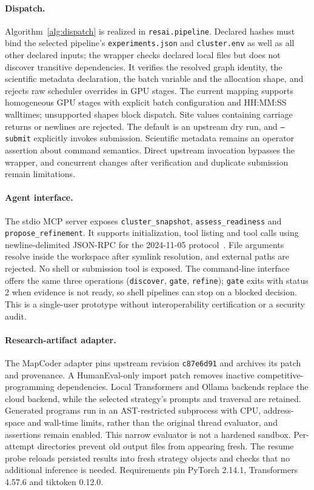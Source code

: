 \documentclass[pdflatex,sn-mathphys-num]{sn-jnl}
\theoremstyle{thmstylethree}
\newcommand{\code}[1]{\texttt{#1}}
\begin{document}
\paragraph{Dispatch.} Algorithm~\ref{alg:dispatch} is realized in \code{resai.pipeline}. Declared hashes must bind the selected pipeline's \code{experiments.json} and \code{cluster.env} as well as all other declared inputs; the wrapper checks declared local files but does not discover transitive dependencies. It verifies the resolved graph identity, the scientific metadata declaration, the batch variable and the allocation shape, and rejects raw scheduler overrides in GPU stages. The current mapping supports homogeneous GPU stages with explicit batch configuration and HH:MM:SS walltimes; unsupported shapes block dispatch. Site values containing carriage returns or newlines are rejected. The default is an upstream dry run, and \code{--submit} explicitly invokes submission. Scientific metadata remains an operator assertion about command semantics. Direct upstream invocation bypasses the wrapper, and concurrent changes after verification and duplicate submission remain limitations.

\paragraph{Agent interface.} The stdio MCP server exposes \code{cluster\_snapshot}, \code{assess\_readiness} and \code{propose\_refinement}. It supports initialization, tool listing and tool calls using newline-delimited JSON-RPC for the 2024-11-05 protocol~\cite{mcp2024transport}. File arguments resolve inside the workspace after symlink resolution, and external paths are rejected. No shell or submission tool is exposed. The command-line interface offers the same three operations (\code{discover}, \code{gate}, \code{refine}); \code{gate} exits with status 2 when evidence is not ready, so shell pipelines can stop on a blocked decision. This is a single-user prototype without interoperability certification or a security audit.

\paragraph{Research-artifact adapter.} The MapCoder adapter pins upstream revision \code{c87e6d91} and archives its patch and provenance. A HumanEval-only import patch removes inactive competitive-programming dependencies. Local Transformers and Ollama backends replace the cloud backend, while the selected strategy's prompts and traversal are retained. Generated programs run in an AST-restricted subprocess with CPU, address-space and wall-time limits, rather than the original thread evaluator, and assertions remain enabled. This narrow evaluator is not a hardened sandbox. Per-attempt directories prevent old output files from appearing fresh. The resume probe reloads persisted results into fresh strategy objects and checks that no additional inference is needed. Requirements pin PyTorch 2.14.1, Transformers 4.57.6 and tiktoken 0.12.0.
\end{document}
